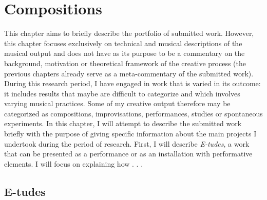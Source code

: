 \hypertarget{chapter7}{}
\chapter{Compositions}

This chapter aims to briefly describe the portfolio of submitted work. However, this chapter focuses exclusively on technical and musical descriptions of the musical output and does not have as its purpose to be a commentary on the background, motivation or theoretical framework of the creative process (the previous chapters already serve as a meta-commentary of the submitted work). During this research period, I have engaged in work that is varied in its outcome: it includes results that maybe are difficult to categorize and which involves varying musical practices. Some of my creative output therefore may be categorized as compositions, improvisations, performances, studies or spontaneous experiments. In this chapter, I will attempt to describe the submitted work briefly with the purpose of giving specific information about the main projects I undertook during the period of research. First, I will describe \emph{E-tudes}, a work that can be presented as a performance or as an installation with performative elements. I will focus on explaining how . . .

\section{E-tudes}

